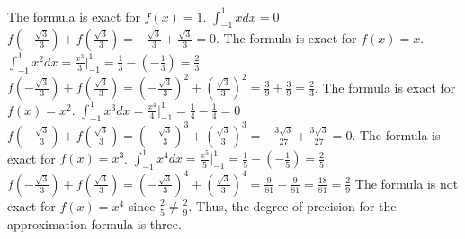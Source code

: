 \documentclass[12pt]{article}
\begin{document}
\begin{enumerate}[leftmargin=2em]
\begin{enumerate}[leftmargin=!]
        The formula is exact for \(f(x)=1\).
        \(\int _{-1}^{1}xdx=0\)
        \(f(-\frac{\sqrt{3}}{3})+f(\frac{\sqrt{3}}{3})=-\frac{\sqrt{3}}{3}+\frac{\sqrt{3}}{3}=0\).
        The formula is exact for \(f(x)=x\).
        \(\int _{-1}^{1}x^{2}dx=\frac{x^{3}}{3}\Big|_{-1}^{1}=\frac{1}{3}-(-\frac{1}{3})=\frac{2}{3}\)
        \(f(-\frac{\sqrt{3}}{3})+f(\frac{\sqrt{3}}{3})=(-\frac{\sqrt{3}}{3})^{2}+(\frac{\sqrt{3}}{3})^{2}=\frac{3}{9}+\frac{3}{9}=\frac{2}{3}\).
        The formula is exact for \(f(x)=x^{2}\).
        \(\int _{-1}^{1}x^{3}dx=\frac{x^{4}}{4}\Big|_{-1}^{1}=\frac{1}{4}-\frac{1}{4}=0\)
        \(f(-\frac{\sqrt{3}}{3})+f(\frac{\sqrt{3}}{3})=(-\frac{\sqrt{3}}{3})^{3}+(\frac{\sqrt{3}}{3})^{3}=-\frac{3\sqrt{3}}{27}+\frac{3\sqrt{3}}{27}=0\).
        The formula is exact for \(f(x)=x^{3}\).
        \(\int _{-1}^{1}x^{4}dx=\frac{x^{5}}{5}\Big|_{-1}^{1}=\frac{1}{5}-(-\frac{1}{5})=\frac{2}{5}\)
        \(f(-\frac{\sqrt{3}}{3})+f(\frac{\sqrt{3}}{3})=(-\frac{\sqrt{3}}{3})^{4}+(\frac{\sqrt{3}}{3})^{4}=\frac{9}{81}+\frac{9}{81}=\frac{18}{81}=\frac{2}{9}\)
        The formula is not exact for \(f(x)=x^{4}\) since \(\frac{2}{5}\ne \frac{2}{9}\).
        Thus, the degree of precision for the approximation formula is three.
    \end{enumerate}
\end{enumerate}
\end{document}
